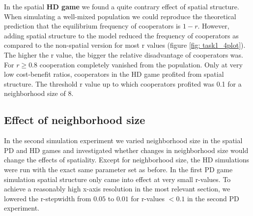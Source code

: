In the spatial \textbf{HD game} we found a quite contrary effect of spatial structure. When simulating a well-mixed population we could reproduce the theoretical prediction that the equilibrium frequency of cooperators is $1 - r$. However, adding spatial structure to the model reduced the frequency of cooperators as compared to the non-spatial version for most r values (figure \ref{fig: task1_4plot}). The higher the r value, the bigger the relative disadvantage of cooperators was. For $r \geq 0.8$ cooperation completely vanished from the population. Only at very low cost-benefit ratios, cooperators in the HD game profited from spatial structure. The threshold r value up to which cooperators profited was 0.1 for a neighborhood size of 8.



\subsection{Effect of neighborhood size}

In the second simulation experiment we varied neighborhood size in the spatial PD and HD games and investigated whether changes in neighborhood size would change the effects of spatiality. Except for neighborhood size, the HD simulations were run with the exact same parameter set as before. In the first PD game simulation spatial structure only came into effect at very small r-values. To achieve a reasonably high x-axis resolution in the most relevant section, we lowered the r-stepwidth from $0.05$ to $0.01$ for r-values $< 0.1$ in the second PD experiment.


